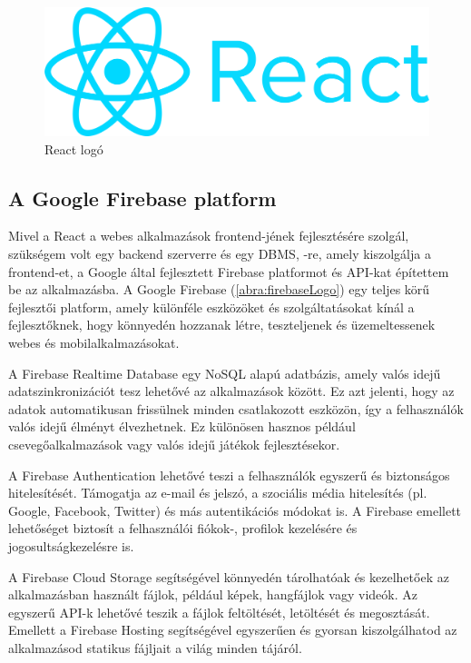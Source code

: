 \begin{figure}[!h]
	\centering
	\includegraphics[scale=0.04]{images/reactLogo}
	\caption{React logó}
	\label{abra:reactLogo}
\end{figure}

\subsection {A Google Firebase platform}

Mivel a React a webes alkalmazások frontend-jének fejlesztésére szolgál, szükségem volt egy backend szerverre és egy DBMS, -re, amely kiszolgálja a frontend-et, a Google által fejlesztett Firebase platformot és API-kat építettem be az alkalmazásba.
A Google Firebase (\ref{abra:firebaseLogo}) egy teljes körű fejlesztői platform, amely különféle eszközöket és szolgáltatásokat kínál a fejlesztőknek, hogy könnyedén hozzanak létre, teszteljenek és üzemeltessenek webes és mobilalkalmazásokat.

A Firebase Realtime Database egy NoSQL alapú adatbázis, amely valós idejű adatszinkronizációt tesz lehetővé az alkalmazások között. Ez azt jelenti, hogy az adatok automatikusan frissülnek minden csatlakozott eszközön, így a felhasználók valós idejű élményt élvezhetnek. Ez különösen hasznos például csevegőalkalmazások vagy valós idejű játékok fejlesztésekor. 

A Firebase Authentication lehetővé teszi a felhasználók egyszerű és biztonságos hitelesítését. Támogatja az e-mail és jelszó, a szociális média hitelesítés (pl. Google, Facebook, Twitter) és más autentikációs módokat is. A Firebase emellett lehetőséget biztosít a felhasználói fiókok-, profilok kezelésére és jogosultságkezelésre is. 

A Firebase Cloud Storage segítségével könnyedén tárolhatóak és kezelhetőek az alkalmazásban használt fájlok, például képek, hangfájlok vagy videók. Az egyszerű API-k lehetővé teszik a fájlok feltöltését, letöltését és megosztását. Emellett a Firebase Hosting segítségével egyszerűen és gyorsan kiszolgálhatod az alkalmazásod statikus fájljait a világ minden tájáról.

